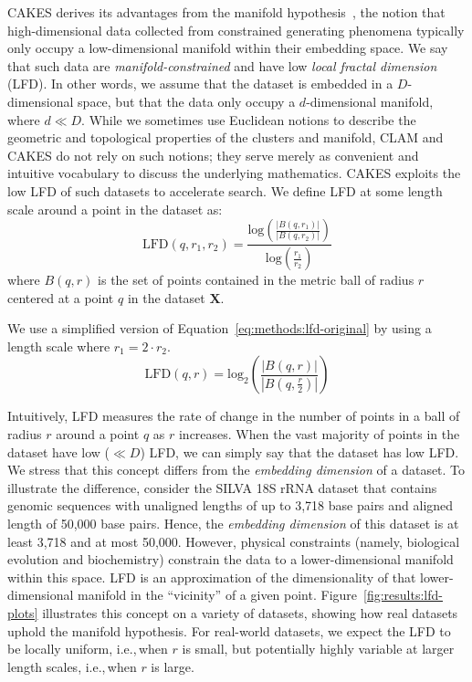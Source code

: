 CAKES derives its advantages from the manifold hypothesis~\cite{fefferman2016testing}, the notion that high-dimensional data collected from constrained generating phenomena typically only occupy a low-dimensional manifold within their embedding space.
We say that such data are \textit{manifold-constrained} and have low \textit{local fractal dimension} (LFD).
In other words, we assume that the dataset is embedded in a $D$-dimensional space, but that the data only occupy a $d$-dimensional manifold, where $d \ll D$.
While we sometimes use Euclidean notions to describe the geometric and topological properties of the clusters and manifold, CLAM and CAKES do not rely on such notions;
they serve merely as convenient and intuitive vocabulary to discuss the underlying mathematics.
CAKES exploits the low LFD of such datasets to accelerate search.
We define LFD at some length scale around a point in the dataset as:
\begin{equation}
    \text{LFD}(q, r_1, r_2) = \frac{\text{log} \left( \frac{|B(q, r_1)|}{|B(q, r_2)|} \right) }{\text{log} \left( \frac{r_1}{r_2} \right) }
    \label{eq:methods:lfd-original}
\end{equation}
where $B(q, r)$ is the set of points contained in the metric ball of radius $r$ centered at a point $q$ in the dataset $\textbf{X}$.

We use a simplified version of Equation~\ref{eq:methods:lfd-original} by using a length scale where $r_1 = 2 \cdot r_2$.
\begin{equation}
    \text{LFD}(q, r) = \text{log}_2 \left( \frac{|B(q, r)|}{|B(q, \frac{r}{2})|} \right)
    \label{eq:methods:lfd-half}
\end{equation}

Intuitively, LFD measures the rate of change in the number of points in a ball of radius $r$ around a point $q$ as $r$ increases. When the vast majority of points in the dataset have low ($\ll D$) LFD, we can simply say that the dataset has low LFD.
We stress that this concept differs from the \textit{embedding dimension} of a dataset.
To illustrate the difference, consider the SILVA 18S rRNA dataset that contains genomic sequences with unaligned lengths of up to 3,718 base pairs and aligned length of 50,000 base pairs.
Hence, the \textit{embedding dimension} of this dataset is at least 3,718 and at most 50,000.
However, physical constraints (namely, biological evolution and biochemistry) constrain the data to a lower-dimensional manifold within this space.
LFD is an approximation of the dimensionality of that lower-dimensional manifold in the ``vicinity'' of a given point.
Figure~\ref{fig:results:lfd-plots} illustrates this concept on a variety of datasets, showing how real datasets uphold the manifold hypothesis.
For real-world datasets, we expect the LFD to be locally uniform, i.e.,\,when $r$ is small, but potentially highly variable at larger length scales, i.e.,\,when $r$ is large.


